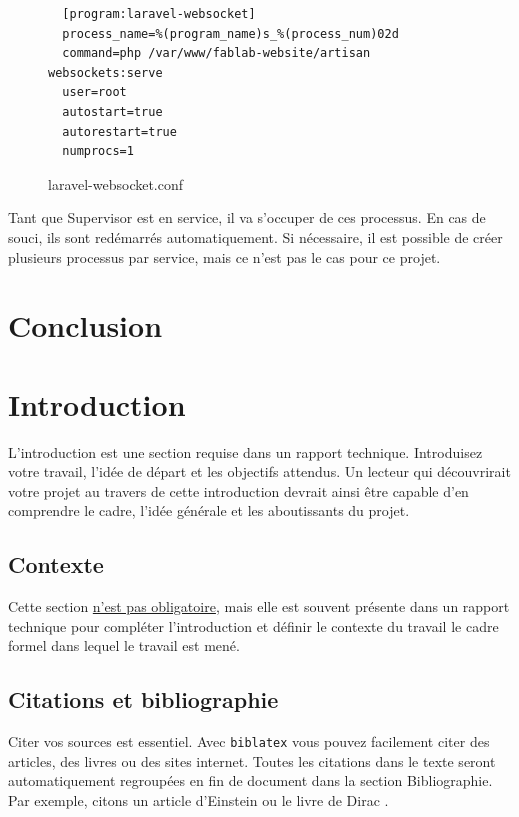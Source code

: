 \documentclass[
    iai, %
    eai, %
]{heig-tb}
\begin{document}
\begin{figure}[h]
  \begin{verbatim}
  [program:laravel-websocket]
  process_name=%(program_name)s_%(process_num)02d
  command=php /var/www/fablab-website/artisan websockets:serve
  user=root
  autostart=true
  autorestart=true
  numprocs=1
  \end{verbatim}
  \caption{laravel-websocket.conf}
\end{figure}

Tant que Supervisor est en service, il va s'occuper de ces processus. En cas de souci, ils sont redémarrés automatiquement. Si nécessaire, il est possible de créer plusieurs processus par service, mais ce n'est pas le cas pour ce projet.

\newpage
\chapter{Conclusion}





\chapter{Introduction}
L'introduction est une section requise dans un rapport technique. Introduisez votre travail, l'idée de départ et les objectifs attendus. Un lecteur qui découvrirait votre projet au travers de cette introduction devrait ainsi être capable d'en comprendre le cadre, l'idée générale et les aboutissants du projet.

\section{Contexte}
Cette section \underline{n'est pas obligatoire}, mais elle est souvent présente dans un rapport technique pour compléter l'introduction et définir le contexte du travail \cad le cadre formel dans lequel le travail est mené.

\section{Citations et bibliographie}
Citer vos sources est essentiel. Avec \texttt{biblatex} vous pouvez facilement citer des articles, des livres ou des sites internet. Toutes les citations dans le texte seront automatiquement regroupées en fin de document dans la section \guillemotleft Bibliographie\guillemotright. Par exemple, citons un article d'Einstein \cite{einstein} ou le livre de Dirac \cite{dirac}.
\end{document}
